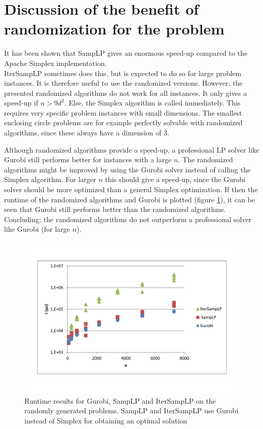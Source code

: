 \documentclass[nocopyrightspace]{acm_proc_article-sp}
\begin{document}
\section{Discussion of the benefit of randomization for the problem}
It has been shown that SampLP gives an enormous speed-up compared to the Apache Simplex implementation. \\ IterSampLP sometimes does this, but is expected to do so for large problem instances. It is therefore useful to use the randomized versions. However, the presented randomized algorithms do not work for all instances. It only gives a speed-up if $n>9d^2$. Else, the Simplex algorithm is called immediately. This requires very specific problem instances with small dimensions. The smallest enclosing circle problems are for example perfectly solvable with randomized algorithms, since these always have a dimension of 3.

Although randomized algorithms provide a speed-up, a professional LP solver like Gurobi still performs better for instances with a large $n$. The randomized algorithms might be improved by using the Gurobi solver instead of calling the Simplex algorithm. For larger $n$ this should give a speed-up, since the Gurobi solver should be more optimized than a general Simplex optimization. If then the runtime of the randomized algorithms and Gurobi is plotted (figure \ref{fig:gurobiruntime}), it can be seen that Gurobi still performs better than the randomized algorithms. Concluding: the randomized algorithms do not outperform a professional solver like Gurobi (for large $n$). 

\begin{figure}[h!]
\includegraphics[width=\columnwidth]{../Results/gurobi_runtime.pdf}
\caption{Runtime results for Gurobi, SampLP and IterSampLP on the randomly generated problems. SampLP and IterSampLP use Gurobi instead of Simplex for obtaining an optimal solution}
\label{fig:gurobiruntime}
\end{figure}
\end{document}
